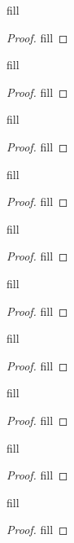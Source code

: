 \begin{exercise}{3}
fill
\end{exercise}
\begin{proof}
fill
\end{proof} 

\begin{exercise}{4}
fill
\end{exercise}
\begin{proof}
fill
\end{proof} 

\begin{exercise}{6}
fill
\end{exercise}
\begin{proof}
fill
\end{proof} 

\begin{exercise}{7}
fill
\end{exercise}
\begin{proof}
fill
\end{proof} 

\begin{exercise}{8}
fill
\end{exercise}
\begin{proof}
fill
\end{proof} 

\begin{exercise}{10}
fill
\end{exercise}
\begin{proof}
fill
\end{proof} 

\begin{exercise}{11}
fill
\end{exercise}
\begin{proof}
fill
\end{proof} 

\begin{exercise}{15}
fill
\end{exercise}
\begin{proof}
fill
\end{proof} 

\begin{exercise}{16}
fill
\end{exercise}
\begin{proof}
fill
\end{proof} 

\begin{exercise}{17}
fill
\end{exercise}
\begin{proof}
fill
\end{proof} 

